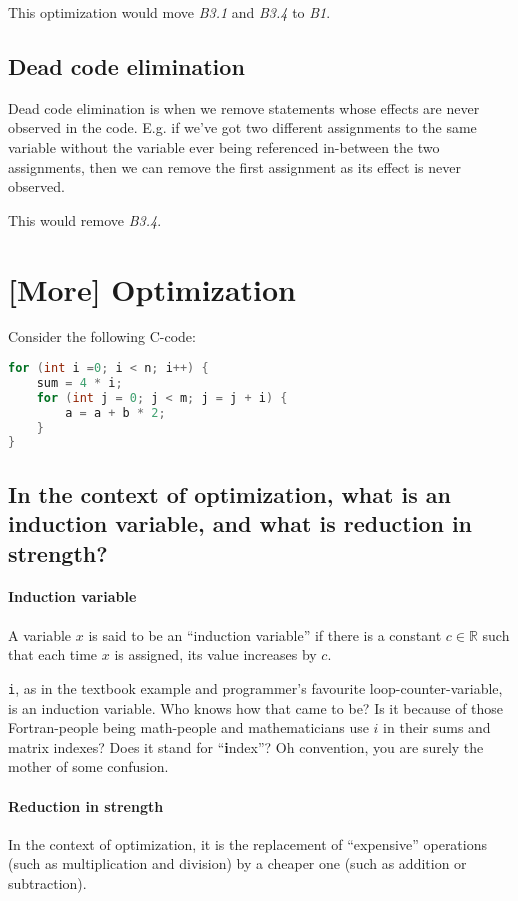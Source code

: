 This optimization would move \textit{B3.1} and \textit{B3.4} to \textit{B1}.

\subsection{Dead code elimination}

Dead code elimination is when we remove statements whose effects are never observed in the code.
E.g. if we've got two different assignments to the same variable without the variable ever being referenced in-between the two assignments, then we can remove the first assignment as its effect is never observed.

This would remove \textit{B3.4}. 

\newpage
\section{[More] Optimization}
Consider the following C-code:
\begin{lstlisting}[language=C, tabsize=4, basicstyle=\ttfamily\small]
for (int i =0; i < n; i++) {
	sum = 4 * i;
	for (int j = 0; j < m; j = j + i) {
		a = a + b * 2;
	}
}
\end{lstlisting}

\subsection{In the context of optimization, what is an induction variable, and what is reduction in strength?}
\paragraph{Induction variable}
A variable $x$ is said to be an ``induction variable'' if there is a constant $c \in \mathbb{R}$ such that each time $x$ is assigned, its value increases by $c$.

\texttt{i}, as in the textbook example and programmer's favourite loop-counter-variable, is an induction variable.
Who knows how that came to be?
Is it because of those Fortran-people being math-people and mathematicians use $i$ in their sums and matrix indexes?
Does it stand for ``\textbf{i}ndex''?
Oh convention, you are surely the mother of some confusion.

\paragraph{Reduction in strength}
In the context of optimization, it is the replacement of ``expensive'' operations (such as multiplication and division) by a cheaper one (such as addition or subtraction).

